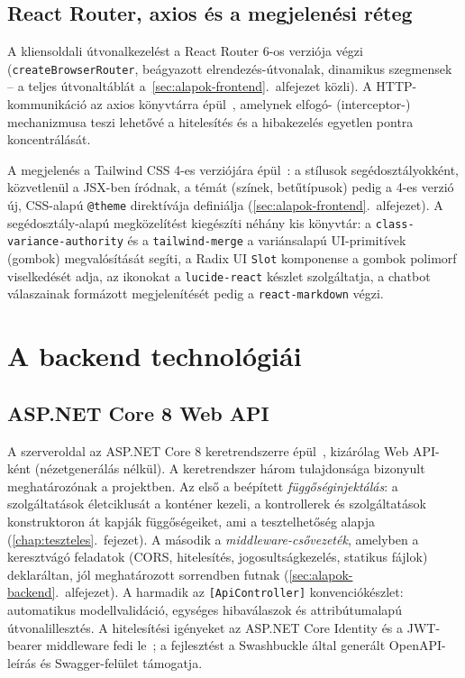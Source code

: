 \subsection{React Router, axios és a megjelenési réteg}

A kliensoldali útvonalkezelést a React Router 6-os verziója végzi~\cite{reactrouter}
(\texttt{createBrowserRouter}, beágyazott elrendezés-útvonalak, dinamikus szegmensek -- a teljes
útvonaltáblát a~\ref{sec:alapok-frontend}.~alfejezet közli). A HTTP-kommunikáció az axios
könyvtárra épül~\cite{axiosdocs}, amelynek elfogó- (interceptor-) mechanizmusa teszi lehetővé a
hitelesítés és a hibakezelés egyetlen pontra koncentrálását.

A megjelenés a Tailwind CSS 4-es verziójára épül~\cite{tailwinddocs}: a stílusok
segédosztályokként, közvetlenül a JSX-ben íródnak, a témát (színek, betűtípusok) pedig a
4-es verzió új, CSS-alapú \texttt{@theme} direktívája definiálja
(\ref{sec:alapok-frontend}.~alfejezet). A segédosztály-alapú megközelítést kiegészíti néhány
kis könyvtár: a \texttt{class-variance-authority} és a \texttt{tailwind-merge} a
variánsalapú UI-primitívek (gombok) megvalósítását segíti, a Radix UI \texttt{Slot}
komponense a gombok polimorf viselkedését adja, az ikonokat a \texttt{lucide-react} készlet
szolgáltatja, a chatbot válaszainak formázott megjelenítését pedig a \texttt{react-markdown}
végzi.

\section{A backend technológiái}
\label{sec:tech-backend}

\subsection{ASP.NET Core 8 Web API}

A szerveroldal az ASP.NET Core 8 keretrendszerre épül~\cite{aspnetcoredocs}, kizárólag Web
API-ként (nézetgenerálás nélkül). A keretrendszer három tulajdonsága bizonyult meghatározónak a
projektben. Az első a beépített \emph{függőséginjektálás}: a szolgáltatások életciklusát a
konténer kezeli, a kontrollerek és szolgáltatások konstruktoron át kapják függőségeiket, ami a
tesztelhetőség alapja (\ref{chap:teszteles}.~fejezet). A második a \emph{middleware-csővezeték},
amelyben a keresztvágó feladatok (CORS, hitelesítés, jogosultságkezelés, statikus fájlok)
deklaráltan, jól meghatározott sorrendben futnak (\ref{sec:alapok-backend}.~alfejezet). A
harmadik az \texttt{[ApiController]} konvenciókészlet: automatikus modellvalidáció,
egységes hibaválaszok és attribútumalapú útvonalillesztés. A hitelesítési igényeket az
ASP.NET Core Identity és a JWT-bearer middleware fedi le~\cite{identitydocs, rfc7519};
a fejlesztést a Swashbuckle által generált OpenAPI-leírás és Swagger-felület támogatja.

